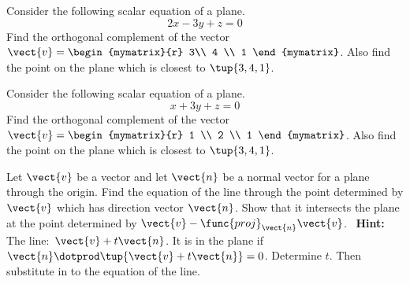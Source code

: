 \begin{enumialphparenastyle}

\begin{ex} Consider the following scalar equation of a plane. 
\begin{equation*}
2x-3y+z=0
\end{equation*}
Find the orthogonal complement of the vector $\vect{v}=\begin{mymatrix}{r}
3\\
4 \\
1
\end{mymatrix} $.
Also find the point on the plane which is closest to $\tup{3,4,1} $.
\end{ex}


\begin{ex} Consider the following scalar equation of a plane. 
\begin{equation*}
x+3y+z=0
\end{equation*}
Find the orthogonal complement of the vector $\vect{v}=\begin{mymatrix}{r}
 1 \\
2 \\
1
\end{mymatrix} $.
Also find the point on the plane which is closest to $\tup{3,4,1} $.
\end{ex}

\begin{ex} Let $\vect{v}$ be a vector and let $\vect{n}$ be a normal vector for a
plane through the origin. Find the equation of the line through the point
determined by $\vect{v}$ which has direction vector $\vect{n}$. Show that it
intersects the plane at the point determined by $\vect{v}-\func{proj}_{\vect{n}
}\vect{v}$. \ \textbf{Hint: }The line:\ $\vect{v}+t\vect{n}$. It is in the
plane if $\vect{n}\dotprod \tup{\vect{v}+t\vect{n}} =0$. Determine $t$.
Then substitute in to the equation of the line.
\end{ex}


\end{enumialphparenastyle}

